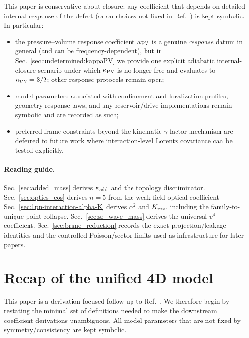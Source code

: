 \documentclass[11pt]{article}
\begin{document}
This paper is conservative about closure: any coefficient that depends on detailed internal response of the defect (or on choices not fixed in Ref.~\cite{norris2026_4d_model}) is kept symbolic.
In particular:
\begin{itemize}
  \item the pressure--volume response coefficient \(\kappa_{\rm PV}\) is a genuine \emph{response} datum in general (and can be frequency-dependent), but in Sec.~\ref{sec:undetermined:kappaPV} we provide one explicit adiabatic internal-closure scenario under which \(\kappa_{\rm PV}\) is no longer free and evaluates to \(\kappa_{\rm PV}=3/2\); other response protocols remain open;
  \item model parameters associated with confinement and localization profiles, geometry response laws, and any reservoir/drive implementations remain symbolic and are recorded as such;
  \item preferred-frame constraints beyond the kinematic \(\gamma\)-factor mechanism are deferred to future work where interaction-level Lorentz covariance can be tested explicitly.
\end{itemize}

\paragraph{Reading guide.}
Sec.~\ref{sec:added_mass} derives \(\kappa_{\rm add}\) and the topology discriminator.
Sec.~\ref{sec:optics_eos} derives \(n=5\) from the weak-field optical coefficient.
Sec.~\ref{sec:1pn-interaction-alpha-K} derives \(\alpha^2\) and \(K_{\rm vec}\), including the family-to-unique-point collapse.
Sec.~\ref{sec:sr_wave_mass} derives the universal \(v^4\) coefficient.
Sec.~\ref{sec:brane_reduction} records the exact projection/leakage identities and the controlled Poisson/sector limits used as infrastructure for later papers.

\section{Recap of the unified 4D model}
\label{sec:recap_4d_model}

This paper is a derivation-focused follow-up to Ref.~\cite{norris2026_4d_model}. We therefore begin by restating the
minimal set of definitions needed to make the downstream coefficient derivations unambiguous.
All model parameters that are not fixed by symmetry/consistency are kept symbolic.
\end{document}
